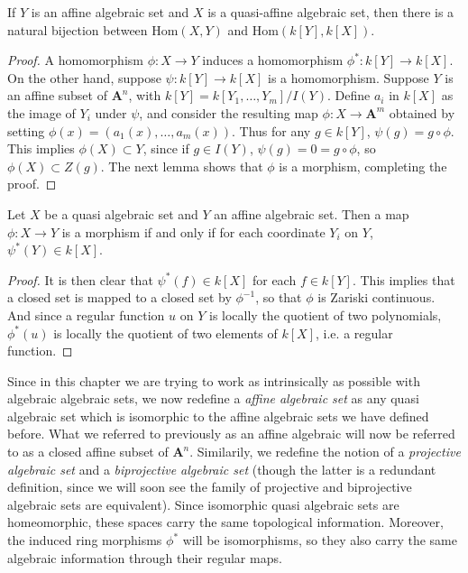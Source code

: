 \begin{theorem}
    If $Y$ is an affine algebraic set and $X$ is a quasi-affine algebraic set, then there is a natural bijection between $\text{Hom}(X,Y)$ and $\text{Hom}(k[Y],k[X])$.
\end{theorem}
\begin{proof}
    A homomorphism $\phi: X \to Y$ induces a homomorphism $\phi^*: k[Y] \to k[X]$. On the other hand, suppose $\psi: k[Y] \to k[X]$ is a homomorphism. Suppose $Y$ is an affine subset of $\mathbf{A}^n$, with $k[Y] = k[Y_1,\dots,Y_m]/I(Y)$. Define $a_i$ in $k[X]$ as the image of $Y_i$ under $\psi$, and consider the resulting map $\phi: X \to \mathbf{A}^m$ obtained by setting $\phi(x) = (a_1(x), \dots, a_m(x))$. Thus for any $g \in k[Y]$, $\psi(g) = g \circ \phi$. This implies $\phi(X) \subset Y$, since if $g \in I(Y)$, $\psi(g) = 0 = g \circ \phi$, so $\phi(X) \subset Z(g)$. The next lemma shows that $\phi$ is a morphism, completing the proof.
\end{proof}

\begin{lemma}
    Let $X$ be a quasi algebraic set and $Y$ an affine algebraic set. Then a map $\phi: X \to Y$ is a morphism if and only if for each coordinate $Y_i$ on $Y$, $\psi^*(Y) \in k[X]$.
\end{lemma}
\begin{proof}
    It is then clear that $\psi^*(f) \in k[X]$ for each $f \in k[Y]$. This implies that a closed set is mapped to a closed set by $\phi^{-1}$, so that $\phi$ is Zariski continuous. And since a regular function $u$ on $Y$ is locally the quotient of two polynomials, $\phi^*(u)$ is locally the quotient of two elements of $k[X]$, i.e. a regular function.
\end{proof}

Since in this chapter we are trying to work as intrinsically as possible with algebraic algebraic sets, we now redefine a \emph{affine algebraic set} as any quasi algebraic set which is isomorphic to the affine algebraic sets we have defined before. What we referred to previously as an affine algebraic will now be referred to as a closed affine subset of $\mathbf{A}^n$. Similarily, we redefine the notion of a \emph{projective algebraic set} and a \emph{biprojective algebraic set} (though the latter is a redundant definition, since we will soon see the family of projective and biprojective algebraic sets are equivalent). Since isomorphic quasi algebraic sets are homeomorphic, these spaces carry the same topological information. Moreover, the induced ring morphisms $\phi^*$ will be isomorphisms, so they also carry the same algebraic information through their regular maps.

